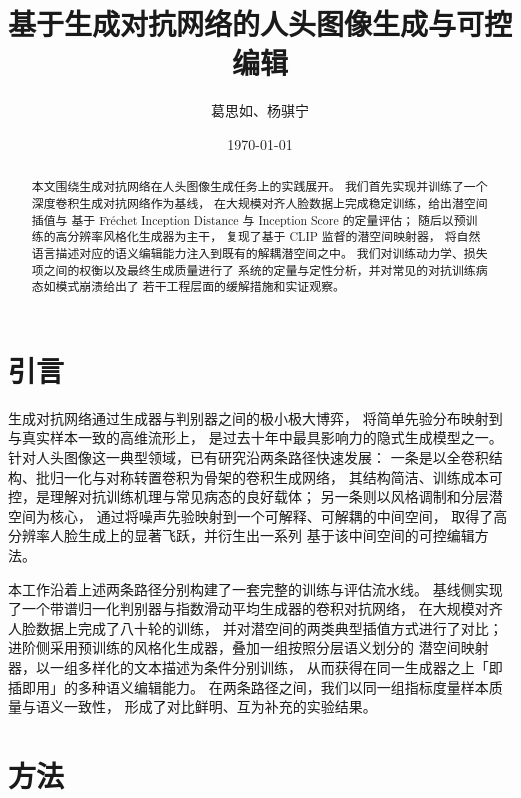 \documentclass[11pt,a4paper]{ctexart}
\title{\bfseries 基于生成对抗网络的人头图像生成与可控编辑}
\author{葛思如、杨骐宁}
\date{\today}
\begin{document}
\maketitle

\begin{abstract}
本文围绕生成对抗网络在人头图像生成任务上的实践展开。
我们首先实现并训练了一个深度卷积生成对抗网络作为基线，
在大规模对齐人脸数据上完成稳定训练，给出潜空间插值与
基于 Fr\'echet Inception Distance 与 Inception Score 的定量评估；
随后以预训练的高分辨率风格化生成器为主干，
复现了基于 CLIP 监督的潜空间映射器，
将自然语言描述对应的语义编辑能力注入到既有的解耦潜空间之中。
我们对训练动力学、损失项之间的权衡以及最终生成质量进行了
系统的定量与定性分析，并对常见的对抗训练病态如模式崩溃给出了
若干工程层面的缓解措施和实证观察。
\end{abstract}

\tableofcontents
\bigskip

\section{引言}
生成对抗网络通过生成器与判别器之间的极小极大博弈，
将简单先验分布映射到与真实样本一致的高维流形上，
是过去十年中最具影响力的隐式生成模型之一。
针对人头图像这一典型领域，已有研究沿两条路径快速发展：
一条是以全卷积结构、批归一化与对称转置卷积为骨架的卷积生成网络，
其结构简洁、训练成本可控，是理解对抗训练机理与常见病态的良好载体；
另一条则以风格调制和分层潜空间为核心，
通过将噪声先验映射到一个可解释、可解耦的中间空间，
取得了高分辨率人脸生成上的显著飞跃，并衍生出一系列
基于该中间空间的可控编辑方法。

本工作沿着上述两条路径分别构建了一套完整的训练与评估流水线。
基线侧实现了一个带谱归一化判别器与指数滑动平均生成器的卷积对抗网络，
在大规模对齐人脸数据上完成了八十轮的训练，
并对潜空间的两类典型插值方式进行了对比；
进阶侧采用预训练的风格化生成器，叠加一组按照分层语义划分的
潜空间映射器，以一组多样化的文本描述为条件分别训练，
从而获得在同一生成器之上「即插即用」的多种语义编辑能力。
在两条路径之间，我们以同一组指标度量样本质量与语义一致性，
形成了对比鲜明、互为补充的实验结果。

\section{方法}
\end{document}
